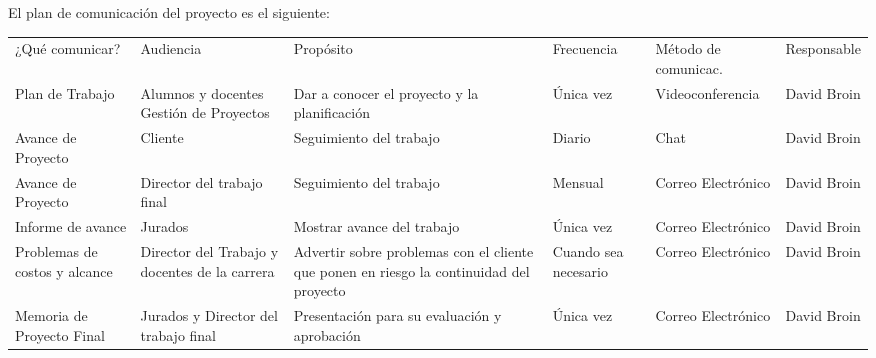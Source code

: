 \documentclass[11pt]{charter}
\begin{document}
El plan de comunicación del proyecto es el siguiente:

\begin{table}[htpb]
  \centering
  \begin{tabularx}{\linewidth}{@{}|X|C{2.4cm}|C{3cm}|C{1.8cm}|C{2cm}|C{2.1cm}|@{}}
  \hline
             \\ \hline
  ¿Qué comunicar? & Audiencia & Propósito & Frecuencia & Método de comunicac. & Responsable \\ \hline
  Plan de Trabajo               & Alumnos y docentes \newline Gestión de Proyectos & Dar a conocer el proyecto y la planificación                                            & Única vez            & Videoconferencia     & David Broin \\ \hline
  Avance de Proyecto            & Cliente                                                                            & Seguimiento del trabajo                                                                 & Diario               & Chat                 & David Broin \\ \hline
  Avance de Proyecto            & Director del trabajo final                                                         & Seguimiento del trabajo                                                                 & Mensual              & Correo Electrónico   & David Broin \\ \hline
  Informe de avance             & Jurados                                                                            & Mostrar avance del trabajo                                                              & Única vez            & Correo Electrónico   & David Broin \\ \hline
  Problemas de costos y alcance & Director del Trabajo y docentes de la carrera                                      & Advertir sobre problemas con el cliente que ponen en riesgo la continuidad del proyecto & Cuando sea necesario & Correo Electrónico   & David Broin \\ \hline
  Memoria de Proyecto Final     & Jurados y Director del trabajo final                                               & Presentación para su evaluación y aprobación                                            & Única vez            & Correo Electrónico   & David Broin \\ \hline
  \end{tabularx}
\end{table}
\end{document}
